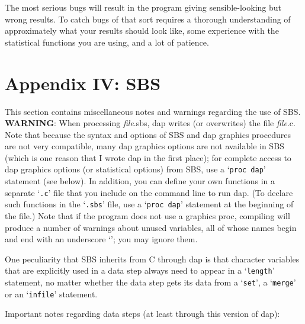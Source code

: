 \documentclass{book}
\newcommand\Texinfocommandstyletextvar[1]{{\normalfont{}\textsl{#1}}}%
\renewcommand{\_}{\Texinfounderscore\discretionary{}{}{}}
\begin{document}
The most serious bugs will result in the program giving sensible-looking
but wrong results.
To catch bugs of that sort requires a thorough understanding of
approximately what your results should look like, some experience
with the statistical functions you are using, and a lot of patience.

\chapter*{{Appendix IV: SBS}}
\label{anchor:Appendix-IV}%

%
%
This section contains miscellaneous notes and warnings regarding
the use of SBS.
\textbf{WARNING}:
When processing \Texinfocommandstyletextvar{file}.sbs, dap writes (or overwrites)
the file \Texinfocommandstyletextvar{file}.c. Note that because the syntax
and options of SBS and dap graphics procedures are not very compatible,
many dap graphics options are not available in SBS (which is one reason
that I wrote dap in the first place); for complete access
to dap graphics options (or statistical options) from SBS,
use a `\texttt{proc dap}' statement (see below).
In addition, you can define your own functions in a separate `\texttt{.c}' file
that you include on the command line to run dap. (To declare such functions
in the `\texttt{.sbs}' file, use a `\texttt{proc dap}' statement at the beginning
of the file.)
Note that if the program does not use a graphics proc,
compiling will produce a number of warnings about unused variables, all of whose
names begin and end with an underscore `\texttt{\_}'; you may ignore them.

One peculiarity that SBS inherits from C through dap
is that character variables that are explicitly
used in a data step always need to appear in a `\texttt{length}' statement,
no matter whether the data step gets its data from a
`\texttt{set}', a `\texttt{merge}' or an `\texttt{infile}' statement.

Important notes regarding data steps (at least through this version of dap):
\end{document}

